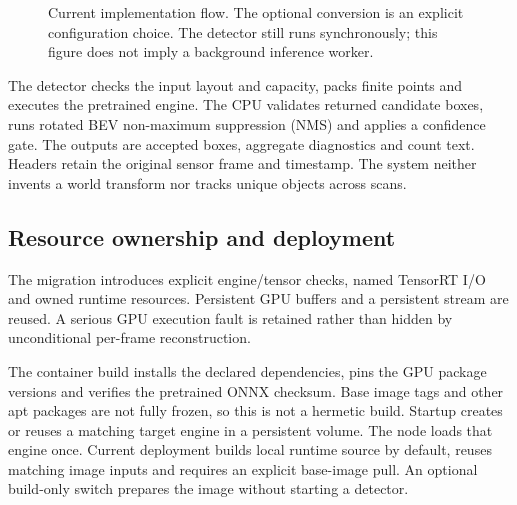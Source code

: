 \documentclass[11pt,a4paper]{article}
\begin{document}
\begin{figure}[htbp]\centering
{}
\caption{Current implementation flow. The optional conversion is an explicit
configuration choice. The detector still runs synchronously; this figure does
not imply a background inference worker.}
\label{fig:architecture}
\end{figure}

The detector checks the input layout and capacity, packs finite points and
executes the pretrained engine. The CPU validates returned candidate boxes,
runs rotated BEV non-maximum suppression (NMS) and applies a confidence gate.
The outputs are accepted boxes, aggregate diagnostics and count text. Headers
retain the original sensor frame and timestamp. The system neither invents a
world transform nor tracks unique objects across scans.

\subsection{Resource ownership and deployment}
The migration introduces explicit engine/tensor checks, named TensorRT I/O and
owned runtime resources. Persistent GPU buffers and a persistent stream are
reused. A serious GPU execution fault is retained rather than hidden by
unconditional per-frame reconstruction.

The container build installs the declared dependencies, pins the GPU package versions and verifies the pretrained ONNX checksum. Base image tags and other apt packages are not fully frozen, so this is not a hermetic build.
Startup creates or reuses a matching target engine in a persistent volume. The
node loads that engine once. Current deployment builds local runtime source by
default, reuses matching image inputs and requires an explicit base-image pull.
An optional build-only switch prepares the image without starting a detector.
\end{document}

